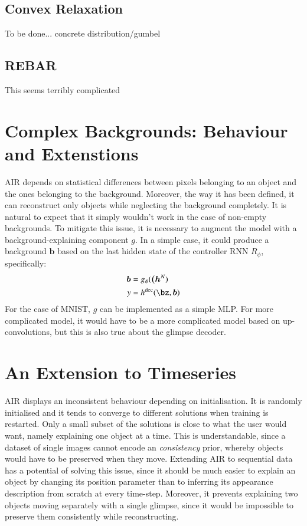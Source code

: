 \documentclass[]{article}
\begin{document}
    \subsection{Convex Relaxation}
        To be done... concrete distribution/gumbel \cite{Maddison2016,Jang2016}
        
    \subsection{REBAR}
        This seems terribly complicated \cite{Tucker2017}
        
\section{Complex Backgrounds: Behaviour and Extenstions}

    AIR depends on statistical differences between pixels belonging to an object and the ones belonging to the background. Moreover, the way it has been defined, it can reconstruct only objects while neglecting the background completely. It is natural to expect that it simply wouldn't work in the case of non-empty backgrounds. To mitigate this issue, it is necessary to augment the model with a background-explaining component $g$. In a simple case, it could produce a background $\bm{b}$ based on the last hidden state of the controller RNN $R_\phi$, specifically:
    \begin{align}
        \bm{b} &= g_\phi( \bm{(h}^N )\\
        y &= h^{\mathrm{dec}}( \bz, \bm{b})
    \end{align}
    For the case of MNIST, $g$ can be implemented as a simple MLP. For more complicated model, it would have to be a more complicated model based on up-convolutions, but this is also true about the glimpse decoder.

\section{An Extension to Timeseries}
    AIR displays an inconsistent behaviour depending on initialisation. It is randomly initialised and it tends to converge to different solutions when training is restarted. Only a small subset of the solutions is close to what the user would want, namely explaining one object at a time. This is understandable, since a dataset of single images cannot encode an \emph{consistency} prior, whereby objects would have to be preserved when they move. Extending AIR to sequential data has a potential of solving this issue, since it should be much easier to explain an object by changing its position parameter than to inferring its appearance description from scratch at every time-step. Moreover, it prevents explaining two objects moving separately with a single glimpse, since it would be impossible to preserve them consistently while reconstructing.
    
\end{document}
